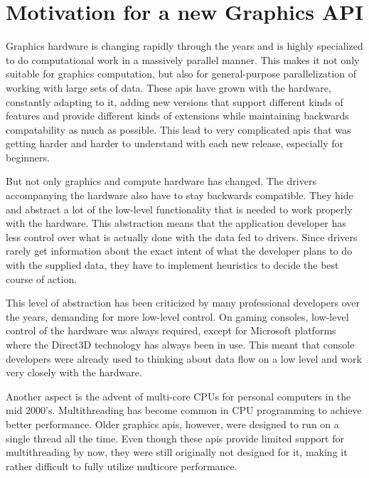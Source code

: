     \tbd


  \section{Motivation for a new Graphics API}

    Graphics hardware is changing rapidly through the years and is highly specialized to do computational work in a massively parallel manner. This makes it not only suitable for graphics computation, but also for general-purpose parallelization of working with large sets of data. These \glspl{api} have grown with the hardware, constantly adapting to it, adding new versions that support different kinds of features and provide different kinds of extensions while maintaining backwards compatability as much as possible. This lead to very complicated \glspl{api} that was getting harder and harder to understand with each new release, especially for beginners.


    But not only graphics and compute hardware has changed. The drivers accompanying the hardware also have to stay backwards compatible. They hide and abstract a lot of the low-level functionality that is needed to work properly with the hardware. This abstraction means that the application developer has less control over what is actually done with the data fed to drivers. Since drivers rarely get information about the exact intent of what the developer plans to do with the supplied data, they have to implement heuristics to decide the best course of action.

    This level of abstraction has been criticized by many professional developers over the years, demanding for more low-level control. On gaming consoles, low-level control of the hardware was always required, except for Microsoft platforms where the Direct3D technology has always been in use. This meant that console developers were already used to thinking about data flow on a low level and work very closely with the hardware.

    Another aspect is the advent of multi-core CPUs for personal computers in the mid 2000's. Multithreading has become common in CPU programming to achieve better performance. Older graphics \glspl{api}, however, were designed to run on a single thread all the time. Even though these \glspl{api} provide limited support for multithreading by now, they were still originally not designed for it, making it rather difficult to fully utilize multicore performance.

